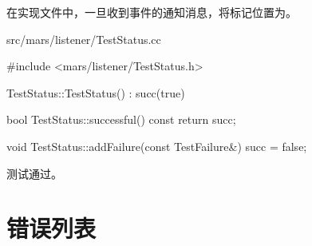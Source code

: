\begin{content}
在实现文件中，一旦收到事件的通知消息，将标记位置为。

\begin{nodiff}{src/mars/listener/TestStatus.cc}
 \begin{c++}
#include <mars/listener/TestStatus.h>

TestStatus::TestStatus() : succ(true) {
}

bool TestStatus::successful() const {
  return succ;
}

void TestStatus::addFailure(const TestFailure&) {
  succ = false;
}
 \end{c++}
\end{nodiff}

测试通过。

\end{content}

\section{错误列表}

